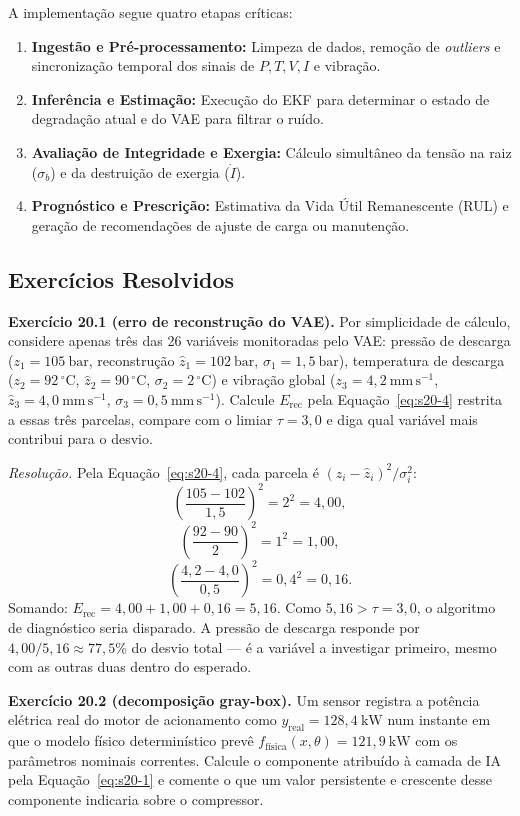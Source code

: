 \documentclass[12pt,a4paper]{article}
\numberwithin{equation}{section}
\numberwithin{table}{section}
\numberwithin{figure}{section}
\begin{document}
	A implementação segue quatro etapas críticas:
	\begin{enumerate}
		\item \textbf{Ingestão e Pré-processamento:} Limpeza de dados, remoção de \textit{outliers} e sincronização temporal dos sinais de $P, T, V, I$ e vibração.
		\item \textbf{Inferência e Estimação:} Execução do EKF para determinar o estado de degradação atual e do VAE para filtrar o ruído.
		\item \textbf{Avaliação de Integridade e Exergia:} Cálculo simultâneo da tensão na raiz ($\sigma_b$) e da destruição de exergia ($\dot{I}$).
		\item \textbf{Prognóstico e Prescrição:} Estimativa da Vida Útil Remanescente (RUL) e geração de recomendações de ajuste de carga ou manutenção.
	\end{enumerate}

	\subsection{Exercícios Resolvidos}

	\textbf{Exercício 20.1 (erro de reconstrução do VAE).} Por simplicidade
	de cálculo, considere apenas três das 26 variáveis monitoradas pelo
	VAE: pressão de descarga ($z_1=105\ \mathrm{bar}$, reconstrução
	$\hat{z}_1=102\ \mathrm{bar}$, $\sigma_1=1{,}5\ \mathrm{bar}$),
	temperatura de descarga ($z_2=92\,^{\circ}\mathrm{C}$,
	$\hat{z}_2=90\,^{\circ}\mathrm{C}$, $\sigma_2=2\,^{\circ}\mathrm{C}$) e
	vibração global ($z_3=4{,}2\ \mathrm{mm\,s^{-1}}$,
	$\hat{z}_3=4{,}0\ \mathrm{mm\,s^{-1}}$,
	$\sigma_3=0{,}5\ \mathrm{mm\,s^{-1}}$). Calcule $E_{\text{rec}}$ pela
	Equação~\eqref{eq:s20-4} restrita a essas três parcelas, compare com o
	limiar $\tau=3{,}0$ e diga qual variável mais contribui para o desvio.

	\emph{Resolução.} Pela Equação~\eqref{eq:s20-4}, cada parcela é
	$(z_i-\hat{z}_i)^2/\sigma_i^2$:
	$$\left(\frac{105-102}{1{,}5}\right)^2 = 2^2 = 4{,}00,$$
	$$\left(\frac{92-90}{2}\right)^2 = 1^2 = 1{,}00,$$
	$$\left(\frac{4{,}2-4{,}0}{0{,}5}\right)^2 = 0{,}4^2 = 0{,}16.$$
	Somando: $E_{\text{rec}} = 4{,}00+1{,}00+0{,}16 = 5{,}16$. Como
	$5{,}16 > \tau = 3{,}0$, o algoritmo de diagnóstico seria disparado. A
	pressão de descarga responde por $4{,}00/5{,}16 \approx 77{,}5\%$ do
	desvio total --- é a variável a investigar primeiro, mesmo com as
	outras duas dentro do esperado.

	\textbf{Exercício 20.2 (decomposição gray-box).} Um sensor registra a
	potência elétrica real do motor de acionamento como
	$y_{\text{real}} = 128{,}4\ \mathrm{kW}$ num instante em que o modelo
	físico determinístico prevê $f_{\text{física}}(x,\theta) =
	121{,}9\ \mathrm{kW}$ com os parâmetros nominais correntes. Calcule o
	componente atribuído à camada de IA pela Equação~\eqref{eq:s20-1} e
	comente o que um valor persistente e crescente desse componente
	indicaria sobre o compressor.
\end{document}
